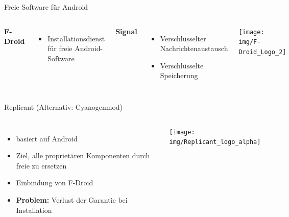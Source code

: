 \documentclass[12pt]{beamer}
\begin{document}
\begin{frame}{Freie Software für Android}
  \begin{columns}
    \column{6cm}

    \textbf{F-Droid}
    \begin{itemize}
      \item Installationsdienst für freie Android-Software
    \end{itemize}

    \vspace{0.5cm}

    \textbf{Signal}
    \begin{itemize}
      \item Verschlüsselter Nachrichtenaustausch
      \item Verschlüsselte Speicherung
    \end{itemize}

    \column{5cm}

    \begin{center}
      \texttt{[image: img/F-Droid\_Logo\_2]}
    \par\end{center}
    \begin{center}
      \includegraphics[width=2cm]{img/TextSecure_Icon}
    \par\end{center}
  \end{columns}
\end{frame}

\begin{frame}{Replicant (Alternativ: Cyanogenmod)}
  \begin{columns}
    \column{6cm}
    \begin{itemize}
      \item basiert auf Android
      \item Ziel, alle proprietären Komponenten durch freie zu ersetzen
      \item Einbindung von F-Droid
      \item \textbf{Problem:} Verlust der Garantie bei Installation
    \end{itemize}
    \column{5cm}
    \begin{center}
      \texttt{[image: img/Replicant\_logo\_alpha]}
    \par\end{center}
  \end{columns}
\end{frame}
\end{document}
